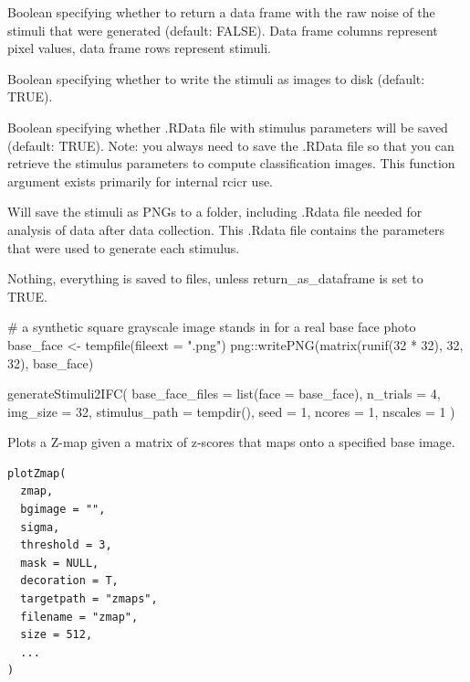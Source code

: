 \documentclass[letterpaper]{book}
\begin{document}
\begin{Arguments}
\begin{ldescription}
\item[\code{return\_as\_dataframe}] Boolean specifying whether to return a data frame with the raw noise of the stimuli that were generated (default: FALSE). Data frame columns represent pixel values, data frame rows represent stimuli.

\item[\code{save\_as\_png}] Boolean specifying whether to write the stimuli as images to disk (default: TRUE).

\item[\code{save\_rdata}] Boolean specifying whether .RData file with stimulus parameters will be saved (default: TRUE). Note: you always need to save the .RData file so that you can retrieve the stimulus parameters to compute classification images. This function argument exists primarily for internal rcicr use.
\end{ldescription}
\end{Arguments}
%
\begin{Details}
Will save the stimuli as PNGs to a folder, including .Rdata file needed for analysis of data
after data collection. This .Rdata file contains the parameters that were used to generate each stimulus.
\end{Details}
%
\begin{Value}
Nothing, everything is saved to files, unless return\_as\_dataframe is set to TRUE.
\end{Value}
%
\begin{Examples}
\begin{ExampleCode}

# a synthetic square grayscale image stands in for a real base face photo
base_face <- tempfile(fileext = ".png")
png::writePNG(matrix(runif(32 * 32), 32, 32), base_face)

generateStimuli2IFC(
  base_face_files = list(face = base_face),
  n_trials = 4,
  img_size = 32,
  stimulus_path = tempdir(),
  seed = 1,
  ncores = 1,
  nscales = 1
)

\end{ExampleCode}
\end{Examples}
%
\begin{Description}
Plots a Z-map given a matrix of z-scores that maps onto a specified base image.
\end{Description}
%
\begin{Usage}
\begin{verbatim}
plotZmap(
  zmap,
  bgimage = "",
  sigma,
  threshold = 3,
  mask = NULL,
  decoration = T,
  targetpath = "zmaps",
  filename = "zmap",
  size = 512,
  ...
)
\end{verbatim}
\end{Usage}
\end{document}
